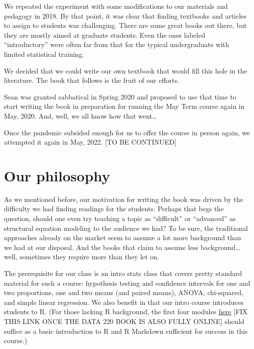 \documentclass[
]{book}
\begin{document}
We repeated the experiment with some modifications to our materials and pedagogy in 2018. By that point, it was clear that finding textbooks and articles to assign to students was challenging. There are some great books out there, but they are mostly aimed at graduate students. Even the ones labeled ``introductory'' were often far from that for the typical undergraduate with limited statistical training.

We decided that we could write our own textbook that would fill this hole in the literature. The book that follows is the fruit of our efforts.

Sean was granted sabbatical in Spring 2020 and proposed to use that time to start writing the book in preparation for running the May Term course again in May, 2020. And, well, we all know how that went\ldots{}

Once the pandemic subsided enough for us to offer the course in person again, we attempted it again in May, 2022. {[}TO BE CONTINUED{]}

\hypertarget{intro-philosophy}{%
\section*{Our philosophy}\label{intro-philosophy}}

As we mentioned before, our motivation for writing the book was driven by the difficulty we had finding readings for the students. Perhaps that begs the question, should one even try teaching a topic as ``difficult'' or ``advanced'' as structural equation modeling to the audience we had? To be sure, the traditional approaches already on the market seem to assume a lot more background than we had at our disposal. And the books that claim to assume less background\ldots well, sometimes they require more than they let on.

The prerequisite for our class is an intro stats class that covers pretty standard material for such a course: hypothesis testing and confidence intervals for one and two proportions, one and two means (and paired means), ANOVA, chi-squared, and simple linear regression. We also benefit in that our intro course introduces students to R. (For those lacking R background, the first four modules \href{https://github.com/VectorPosse/Intro_Stats}{here} {[}FIX THIS LINK ONCE THE DATA 220 BOOK IS ALSO FULLY ONLINE{]} should suffice as a basic introduction to R and R Markdown sufficient for success in this course.)
\end{document}

